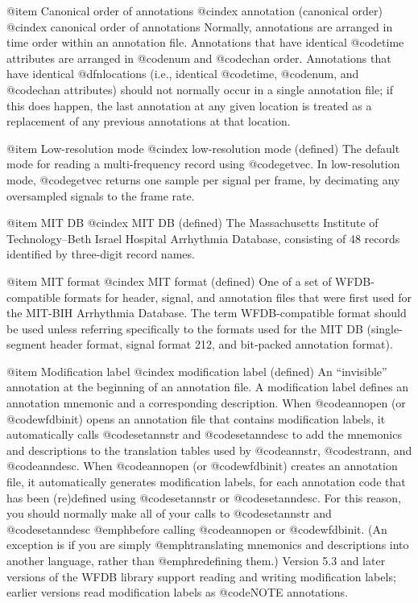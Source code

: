 {{{{{{{{@item Canonical order of annotations
@cindex annotation (canonical order)
@cindex canonical order of annotations
Normally, annotations are arranged in time order within an annotation file.
Annotations that have identical @code{time} attributes are arranged in
@code{num} and @code{chan} order.  Annotations that have identical
@dfn{locations} (i.e., identical @code{time}, @code{num}, and @code{chan}
attributes) should not normally occur in a single annotation file; if this does
happen, the last annotation at any given location is treated as a replacement
of any previous annotations at that location.

@item Low-resolution mode
@cindex low-resolution mode (defined)
The default mode for reading a multi-frequency record using
@code{getvec}.  In low-resolution mode, @code{getvec} returns one
sample per signal per frame, by decimating any oversampled signals
to the frame rate.

@item MIT DB
@cindex MIT DB (defined)
The Massachusetts Institute of Technology--Beth Israel Hospital
Arrhythmia Database, consisting of 48 records identified by three-digit
record names.

@item MIT format
@cindex MIT format (defined)
One of a set of WFDB-compatible formats for header, signal, and
annotation files that were first used for the MIT-BIH Arrhythmia
Database.  The term WFDB-compatible format should be used unless referring
specifically to the formats used for the MIT DB (single-segment header format,
signal format 212, and bit-packed annotation format).

@item Modification label
@cindex modification label (defined)
An ``invisible'' annotation at the beginning of an annotation file.  A
modification label defines an annotation mnemonic and a corresponding
description.  When @code{annopen} (or @code{wfdbinit}) opens an annotation
file that contains modification labels, it automatically calls
@code{setannstr} and @code{setanndesc} to add the mnemonics and
descriptions to the translation tables used by @code{annstr},
@code{strann}, and @code{anndesc}.  When @code{annopen} (or
@code{wfdbinit}) creates an annotation file, it automatically generates
modification labels, for each annotation code that has been (re)defined
using @code{setannstr} or @code{setanndesc}.  For this reason, you
should normally make all of your calls to @code{setannstr} and
@code{setanndesc} @emph{before} calling @code{annopen} or @code{wfdbinit}.
(An exception is if you are simply @emph{translating} mnemonics and
descriptions into another language, rather than @emph{redefining} them.)
Version 5.3 and later versions of the WFDB library support reading and
writing modification labels;  earlier versions read modification labels
as @code{NOTE} annotations.

}}}}}}}}
